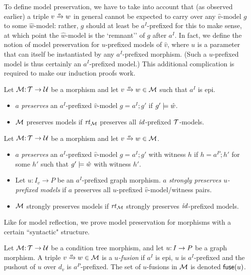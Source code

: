 To define model preservation, we have to take into account that (as observed earlier) a triple $\trip vaw$ in general cannot be expected to carry over any $\hat v$-model $g$ to some $\hat w$-model: rather, $g$ should at least be $a^I$-prefixed for this to make sense, at which point the $\hat w$-model is the `remnant'' of $g$ after $a^I$. In fact, we define the notion of model preservation for $u$-prefixed models of $\hat v$, where $u$ is a parameter that can itself be instantiated by any $a^I$-prefixed morphism. (Such a $u$-prefixed model is thus certainly an $a^I$-prefixed model.) This additional complication is required to make our induction proofs work.
%
\begin{definition}
Let ${\mathcal{M}}{:}\, {\mathcal{T}}\rightarrow{\mathcal{U}}$ be a morphism and let $\trip vaw\in\cM$ such that $a^I$ is epi.
\begin{itemize}[topsep=\smallskipamount]
\item $a$ \emph{preserves} an $a^I$-prefixed $\hat v$-model $g=a^I;g'$ if $g'\models \hat w$.
		
\item ${\mathcal{M}}$ preserves models if $\mathit{rt}_{{\mathcal{M}}}$ preserves all ${\mathit{id}}$-prefixed ${\mathcal{T}}$-models.
\end{itemize}
\end{definition}
%
\begin{definition}
Let ${\mathcal{M}}{:}\, {\mathcal{T}}\rightarrow{\mathcal{U}}$ be a morphism and let $\trip vaw\in\cM$.
\begin{itemize}[topsep=\smallskipamount]
\item $a$ \emph{preserves} an $a^I$-prefixed $\hat v$-model $g=a^I;g'$ with witness $h$ if $h=a^P;h'$ for some $h'$ such that $g'\models \hat w$ with witness $h'$.
		
\item Let $u:I_v\to P$ be an $a^I$-prefixed graph morphism. $a$ \emph{strongly preserves $u$-prefixed models} if $a$ preserves all $u$-prefixed $\hat v$-model/witness pairs.
		
\item ${\mathcal{M}}$ strongly preserves models if $\mathit{rt}_{{\mathcal{M}}}$ strongly preserves ${\mathit{id}}$-prefixed models.
\end{itemize}
\end{definition}
%
Like for model reflection, we prove model preservation for morphisms with a certain ``syntactic" structure.

\begin{definition}
Let ${\mathcal{M}}{:}\, {\mathcal{T}}\rightarrow{\mathcal{U}}$ be a condition tree morphism, and let $u{:}\, I\rightarrow P$ be a graph morphism. A triple $\trip vaw\in\cM$ is a \emph{$u$-fusion} if $a^I$ is epi, $u$ is $a^I$-prefixed and the pushout of $u$ over $d_v$ is $a^P$-prefixed. The set of $u$-fusions in ${\mathcal{M}}$ is denoted ${\mathsf{fuse}}(u)$.
\end{definition}

